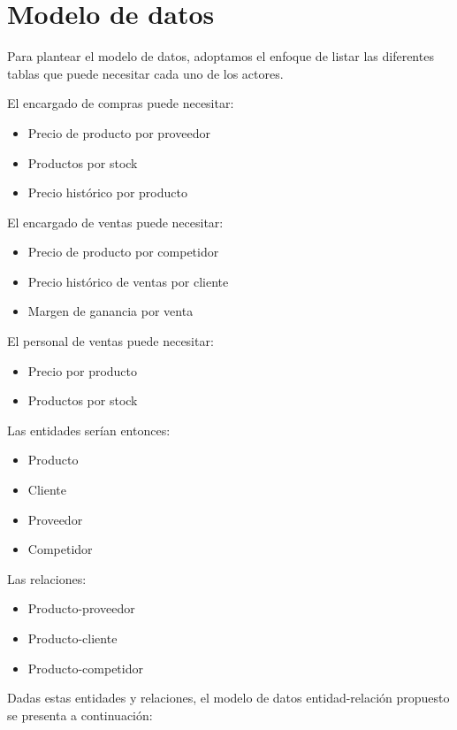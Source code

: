 
\section{Modelo de datos}

Para plantear el modelo de datos,
adoptamos el enfoque de listar las diferentes tablas que puede necesitar cada uno de los actores.

El encargado de compras puede necesitar:
\begin{itemize}
	\item Precio de producto por proveedor 
	\item Productos por stock 
	\item Precio histórico por producto
\end{itemize}

El encargado de ventas puede necesitar:
\begin{itemize}
	\item Precio de producto por competidor
	\item Precio histórico de ventas por cliente
	\item Margen de ganancia por venta
\end{itemize}

El personal de ventas puede necesitar:
\begin{itemize}
	\item Precio por producto
	\item Productos por stock 
\end{itemize}

Las entidades serían entonces:
\begin{itemize}
	\item Producto
	\item Cliente 
	\item Proveedor 
	\item Competidor 
\end{itemize}

Las relaciones:
\begin{itemize}
	\item Producto-proveedor 
	\item Producto-cliente 
	\item Producto-competidor 
\end{itemize}

Dadas estas entidades y relaciones,
el modelo de datos entidad-relación propuesto se presenta a continuación:

